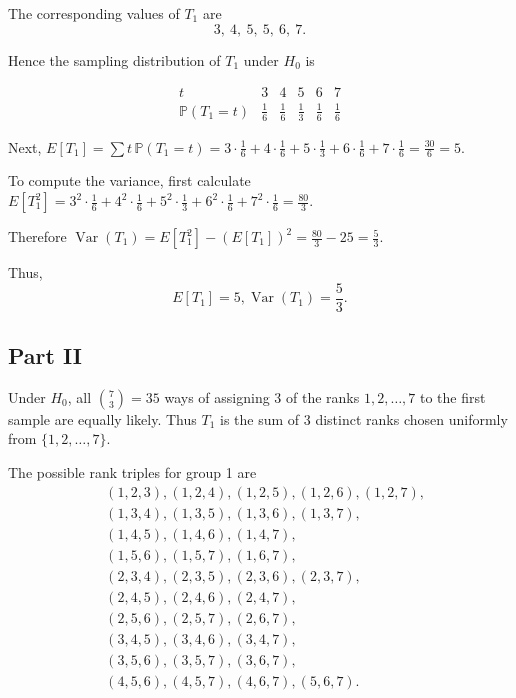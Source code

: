 \documentclass[letterpaper]{article}
\begin{document}
	The corresponding values of $T_1$ are
	\[
	3,\ 4,\ 5,\ 5,\ 6,\ 7.
	\]
	
	Hence the sampling distribution of $T_1$ under $H_0$ is
	
	\[
	\begin{array}{c|ccccc}
		t & 3 & 4 & 5 & 6 & 7\\
		\hline
		\mathbb{P}(T_1=t) & \frac16 & \frac16 & \frac13 & \frac16 & \frac16
	\end{array}
	\]
	
	Next,
	$E[T_1] = \sum t\,\mathbb{P}(T_1=t)
	= 3\cdot\frac16 + 4\cdot\frac16 + 5\cdot\frac13 + 6\cdot\frac16 + 7\cdot\frac16
	= \frac{30}{6} = 5$.
	
	To compute the variance, first calculate
	$E[T_1^2] =
	3^2\cdot\frac16 + 4^2\cdot\frac16 + 5^2\cdot\frac13 + 6^2\cdot\frac16 + 7^2\cdot\frac16
	= \frac{80}{3}$.
	
	Therefore
	$\operatorname{Var}(T_1)
	= E[T_1^2] - (E[T_1])^2
	= \frac{80}{3} - 25
	= \frac{5}{3}$.
	
	Thus,
	\[
	E[T_1] = 5,  \operatorname{Var}(T_1) = \frac{5}{3}.
	\] 
	
	\clearpage
	
	\subsection{Part II}
	
	Under $H_0$, all $\binom{7}{3}=35$ ways of assigning $3$ of the ranks
	$1,2,\dots,7$ to the first sample are equally likely. Thus $T_1$ is the sum of
	$3$ distinct ranks chosen uniformly from $\{1,2,\dots,7\}$.
	
	The possible rank triples for group 1 are
	\[
	\begin{aligned}
		&(1,2,3),(1,2,4),(1,2,5),(1,2,6),(1,2,7),\\
		&(1,3,4),(1,3,5),(1,3,6),(1,3,7),\\
		&(1,4,5),(1,4,6),(1,4,7),\\
		&(1,5,6),(1,5,7),(1,6,7),\\
		&(2,3,4),(2,3,5),(2,3,6),(2,3,7),\\
		&(2,4,5),(2,4,6),(2,4,7),\\
		&(2,5,6),(2,5,7),(2,6,7),\\
		&(3,4,5),(3,4,6),(3,4,7),\\
		&(3,5,6),(3,5,7),(3,6,7),\\
		&(4,5,6),(4,5,7),(4,6,7),(5,6,7).
	\end{aligned}
	\]
	
\end{document}
